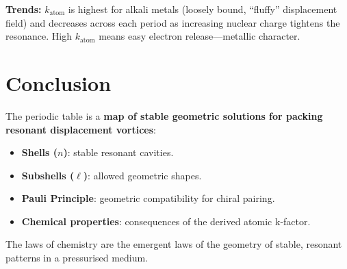 \textbf{Trends:} $k_{\text{atom}}$ is highest for alkali metals (loosely bound, ``fluffy'' displacement field) and decreases across each period as increasing nuclear charge tightens the resonance.  High $k_{\text{atom}}$ means easy electron release---metallic character.


\section{Conclusion}

The periodic table is a \textbf{map of stable geometric solutions for packing resonant displacement vortices}:
\begin{itemize}
  \item \textbf{Shells ($n$)}: stable resonant cavities.
  \item \textbf{Subshells ($\ell$)}: allowed geometric shapes.
  \item \textbf{Pauli Principle}: geometric compatibility for chiral pairing.
  \item \textbf{Chemical properties}: consequences of the derived atomic k-factor.
\end{itemize}

The laws of chemistry are the emergent laws of the geometry of stable, resonant patterns in a pressurised medium.

